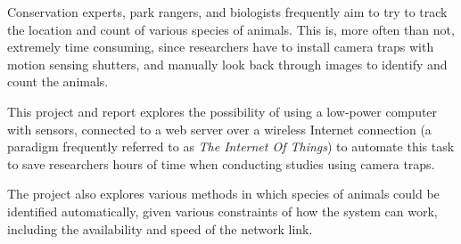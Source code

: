 Conservation experts, park rangers, and biologists frequently aim to try to
track the location and count of various species of animals. This is, more
often than not, extremely time consuming, since researchers have to install
camera traps with motion sensing shutters, and manually look back through
images to identify and count the animals.

This project and report explores the possibility of using a low-power
computer with sensors, connected to a web server over a wireless Internet
connection (a paradigm frequently referred to as \textit{The Internet Of
Things}) to automate this task to save researchers hours of time when
conducting studies using camera traps.

The project also explores various methods in which species of animals could
be identified automatically, given various constraints of how the system can
work, including the availability and speed of the network link.
